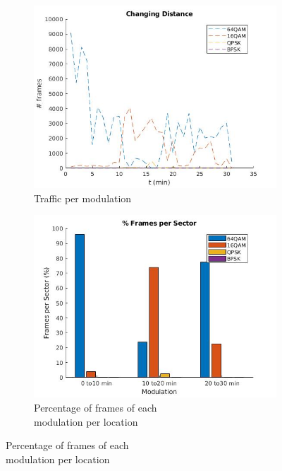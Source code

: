 \documentclass[12]{article}
\begin{document}
\\\\
\begin{figure}[!htb]
\hspace*{-3cm}
\begin{subfigure}{.5\textwidth}
  \centering
  \includegraphics[width=\linewidth]{"measurement 1/n_test1"}
  \caption{Traffic per modulation}
  \label{fig:n_meas1_sub1}
\end{subfigure}%
\hspace*{-0.6cm}
\begin{subfigure}{.5\textwidth}
  \includegraphics[width=\linewidth]{"measurement 1/n_tes2"}
  \caption{Percentage of frames of each\\ modulation per location}

\end{subfigure}
\end{figure}
\end{document}
